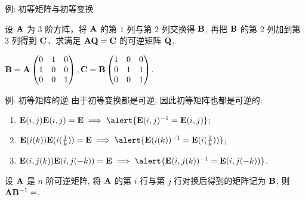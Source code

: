 \begin{frame}{例: 初等矩阵与初等变换}
	\onslide<+->
	\begin{example}
		设 ${\mathbf{A}}$ 为 $3$ 阶方阵，将 ${\mathbf{A}}$ 的第 $1$ 列与第 $2$ 列交换得 $\bf	B$, 再把 ${\mathbf{B}}$ 的第 $2$ 列加到第 $3$ 列得到 ${\mathbf{C}}$．求满足 ${\mathbf{A}}{\mathbf{Q}}={\mathbf{C}}$ 的可逆矩阵 ${\mathbf{Q}}$.
	\end{example}
	\onslide<+->
	\begin{solution}
		${\mathbf{B}}={\mathbf{A}}\begin{pmatrix}
			0&1&0\\1&0&0\\0&0&1
		\end{pmatrix},{\mathbf{C}}={\mathbf{B}}\begin{pmatrix}
			1&0&0\\0&1&1\\0&0&1
		\end{pmatrix}$.
		\onslide<+->{因此
		\[\bfQ=\begin{pmatrix}
			0&1&0\\1&0&0\\0&0&1
		\end{pmatrix}\begin{pmatrix}
			1&0&0\\0&1&1\\0&0&1
		\end{pmatrix}=\begin{pmatrix}
			0&1&1\\1&0&0\\0&0&1
		\end{pmatrix}.\]}
	\end{solution}
\end{frame}


\begin{frame}{例: 初等矩阵的逆}
	\onslide<+->
	由于初等变换都是可逆, 因此初等矩阵也都是可逆的:
	\onslide<+->
	\begin{enumerate}
		\item $\bfE(i,j)\bfE(i,j)=\bfE\implies \alert{\bfE(i,j)^{-1}=\bfE(i,j)}$;
		\item $\bfE(i(k))\bfE(i(\frac1k))=\bfE\implies\alert{\bfE(i(k))^{-1}=\bfE(i(\frac1k))}$;
		\item $\bfE(i,j(k))\bfE(i,j(-k))=\bfE\implies\alert{\bfE(i,j(k))^{-1}=\bfE(i,j(-k))}$.
	\end{enumerate}
	\onslide<+->
	\begin{example}
		设 ${\mathbf{A}}$ 是 $n$ 阶可逆矩阵, 将 ${\mathbf{A}}$ 的第 $i$ 行与第 $j$ 行对换后得到的矩阵记为 ${\mathbf{B}}$, 则 ${\mathbf{A}}{\mathbf{B}}^{-1}=$.
	\end{example}
\end{frame}



